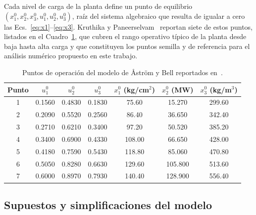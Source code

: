 \documentclass[final,5p,times,twocolumn,authoryear,11pt]{elsarticle}
\begin{document}
Cada nivel de carga de la planta define un punto de equilibrio $(x_1^0,x_2^0,x_3^0,u_1^0,u_2^0,u_3^0)$, raíz del sistema algebraico que resulta de igualar a cero las Ecs.~\eqref{eq:x1}--\eqref{eq:x3}. Kruthika y Paneerselvam~\citep{kruthika2025novel} reportan siete de estos puntos, listados en el Cuadro~\ref{tab:operating_points}, que cubren el rango operativo típico de la planta desde baja hasta alta carga y que constituyen los puntos semilla y de referencia para el análisis numérico propuesto en este trabajo.

\begin{table}[t]
\centering
\footnotesize
\caption{Puntos de operación del modelo de Åström y Bell reportados en~\citep{kruthika2025novel}.}
\label{tab:operating_points}
\begin{tabular}{ccccccc}
\toprule
Punto & $u_1^0$ & $u_2^0$ & $u_3^0$ & $x_1^0$ (kg/cm$^2$) & $x_2^0$ (MW) & $x_3^0$ (kg/m$^3$) \\
\midrule
1 & 0.1560 & 0.4830 & 0.1830 & 75.60  & 15.270  & 299.60 \\
2 & 0.2090 & 0.5520 & 0.2560 & 86.40  & 36.650  & 342.40 \\
3 & 0.2710 & 0.6210 & 0.3400 & 97.20  & 50.520  & 385.20 \\
4 & 0.3400 & 0.6900 & 0.4330 & 108.00 & 66.650  & 428.00 \\
5 & 0.4180 & 0.7590 & 0.5430 & 118.80 & 85.060  & 470.80 \\
6 & 0.5050 & 0.8280 & 0.6630 & 129.60 & 105.800 & 513.60 \\
7 & 0.6000 & 0.8970 & 0.7930 & 140.40 & 128.900 & 556.40 \\
\bottomrule
\end{tabular}
\end{table}

\subsection{Supuestos y simplificaciones del modelo}
\end{document}
